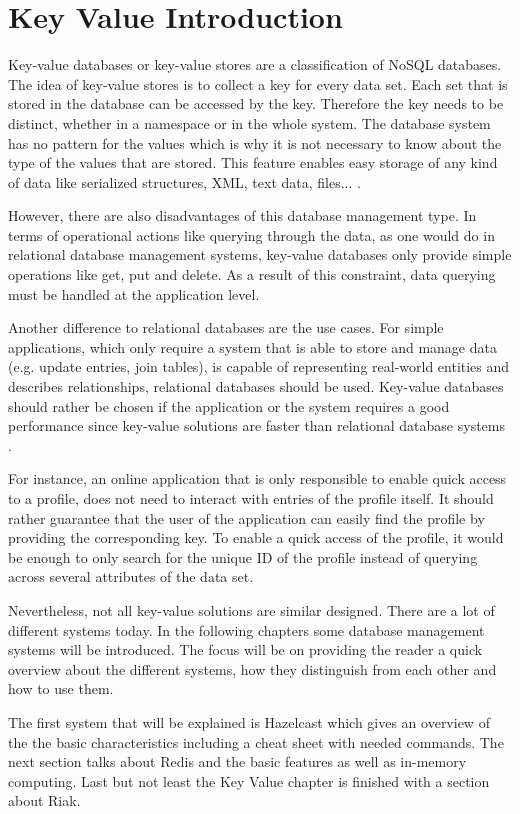 \chapter{Key Value Introduction}
Key-value databases or key-value stores are a classification of NoSQL databases. 
The idea of key-value stores is to collect a key  for every data set. Each set that is stored in the database can be accessed by the key. Therefore the key needs to be distinct, whether in a namespace or in the whole system. The database system has no pattern for the values which is why it is not  necessary to know about the type of the values that are stored. This feature enables easy storage of any kind of data like serialized structures, XML, text data, files...  \parencite{keyValueIntro}.


However, there are also disadvantages of this database management type. In terms of operational actions like querying through the data, as one would do in relational database management systems, key-value databases only provide simple operations like get, put and delete. As a result of this constraint, data querying must be handled at the application level. 

Another difference to relational databases are the use cases. 
 For simple applications, which only require a system that is able to store and manage data (e.g. update entries, join tables), is capable of representing real-world entities and describes relationships, relational databases should be used. Key-value databases should rather be chosen if the application or the system requires a good performance since key-value solutions are faster than relational database systems \parencite{keyValueUsecase}.
 
For instance, an online application that is only responsible to enable quick access to a profile, does not need to interact with entries of the profile itself. It should rather guarantee that the user of the application can easily find the profile by providing the corresponding key. To enable a quick access of the profile, it would be enough to only search for the unique ID of the profile instead of querying across several attributes of the data set.

Nevertheless, not all key-value solutions are similar designed. There are a lot of different systems today. In the following chapters some database management systems will be introduced. The focus will be on providing the reader a quick overview about the different systems, how they distinguish from each other and how to use them.

The first system that will be explained is Hazelcast which gives an overview of the the basic characteristics including a cheat sheet with needed commands. The next section talks about Redis and the basic features as well as in-memory computing. Last but not least the Key Value chapter is finished with a section about Riak. 


